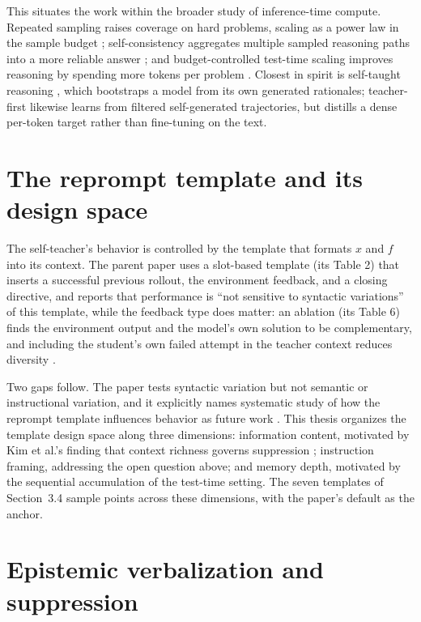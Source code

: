 This situates the work within the broader study of inference-time compute. Repeated sampling raises coverage on hard problems, scaling as a power law in the sample budget \cite{r20}; self-consistency aggregates multiple sampled reasoning paths into a more reliable answer \cite{r18}; and budget-controlled test-time scaling improves reasoning by spending more tokens per problem \cite{r21}. Closest in spirit is self-taught reasoning \cite{r19}, which bootstraps a model from its own generated rationales; teacher-first likewise learns from filtered self-generated trajectories, but distills a dense per-token target rather than fine-tuning on the text.

\section{The reprompt template and its design space}\label{the-reprompt-template-and-its-design-space}

The self-teacher's behavior is controlled by the template that formats \(x\) and \(f\) into its context. The parent paper uses a slot-based template (its Table 2) that inserts a successful previous rollout, the environment feedback, and a closing directive, and reports that performance is ``not sensitive to syntactic variations'' of this template, while the feedback type does matter: an ablation (its Table 6) finds the environment output and the model's own solution to be complementary, and including the student's own failed attempt in the teacher context reduces diversity \cite{r1}.

Two gaps follow. The paper tests syntactic variation but not semantic or instructional variation, and it explicitly names systematic study of how the reprompt template influences behavior as future work \cite{r1}. This thesis organizes the template design space along three dimensions: information content, motivated by Kim et al.'s finding that context richness governs suppression \cite{r2}; instruction framing, addressing the open question above; and memory depth, motivated by the sequential accumulation of the test-time setting. The seven templates of Section~3.4 sample points across these dimensions, with the paper's default as the anchor.

\section{Epistemic verbalization and suppression}\label{epistemic-verbalization-and-suppression}

